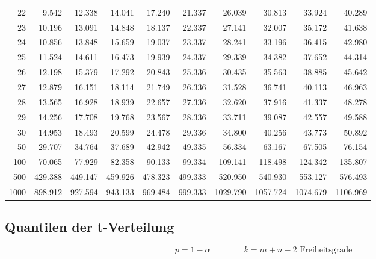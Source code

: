 \begin{center}
\begin{tabular}{|r|rrr|rrr|rrr|}
        22&9.542&12.338&14.041&17.240&21.337&26.039&30.813&33.924&40.289\\
        23&10.196&13.091&14.848&18.137&22.337&27.141&32.007&35.172&41.638\\
        24&10.856&13.848&15.659&19.037&23.337&28.241&33.196&36.415&42.980\\
        25&11.524&14.611&16.473&19.939&24.337&29.339&34.382&37.652&44.314\\
        26&12.198&15.379&17.292&20.843&25.336&30.435&35.563&38.885&45.642\\
        27&12.879&16.151&18.114&21.749&26.336&31.528&36.741&40.113&46.963\\
        28&13.565&16.928&18.939&22.657&27.336&32.620&37.916&41.337&48.278\\
        29&14.256&17.708&19.768&23.567&28.336&33.711&39.087&42.557&49.588\\
        30&14.953&18.493&20.599&24.478&29.336&34.800&40.256&43.773&50.892\\
        50&29.707&34.764&37.689&42.942&49.335&56.334&63.167&67.505&76.154\\
        100&70.065&77.929&82.358&90.133&99.334&109.141&118.498&124.342&135.807\\
        500&429.388&449.147&459.926&478.323&499.333&520.950&540.930&553.127&576.493\\
        1000&898.912&927.594&943.133&969.484&999.333&1029.790&1057.724&1074.679&1106.969\\
        \hline
    \end{tabular}
\end{center}


 
\subsection{Quantilen der t-Verteilung}
\label{Quantilen der t-Verteilung}

$$ \boxed{ p = 1 - \alpha} \qquad \qquad \boxed{ k = m + n - 2 \text{ Freiheitsgrade} } $$

